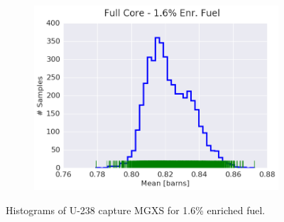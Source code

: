 \begin{figure}[h!]
\begin{subfigure}{0.5\textwidth}
  \includegraphics[width=\linewidth]{figures/patterns/full-core/hist-kde-rug/16-enr-capt-1} \caption{}
  \label{fig:chap9-hist-full-core-1.6-capt}
\end{subfigure}
\caption[Histogram of U-238 capture MGXS for 1.6\% enriched fuel]{Histograms of U-238 capture \ac{MGXS} for 1.6\% enriched fuel.}
\label{fig:chap9-hist-1.6-capt}
\end{figure}

